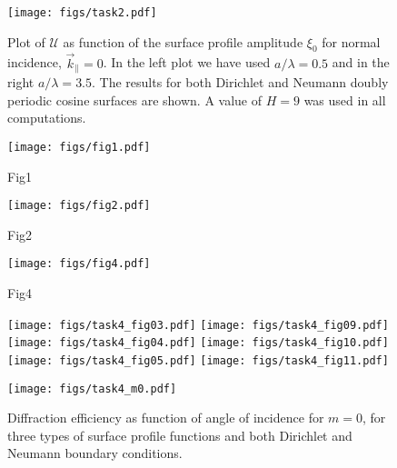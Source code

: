 
\begin{figure}[ht!]%
\centering%
\texttt{[image: figs/task2.pdf]}%
\caption{Plot of $\mathcal{U}$ as function of the surface profile amplitude $\xi_0$ for normal incidence, $\vec k_\| = 0$. In the left plot we have used $a/\lambda=0.5$ and in the right $a/\lambda=3.5$. The results for both Dirichlet and Neumann doubly periodic cosine surfaces are shown. A value of $H=9$ was used in all computations. \label{fig:task2conservation}}%
\end{figure}

\begin{figure}[ht!]%
\centering%
\texttt{[image: figs/fig1.pdf]}%
\caption{Fig1 \label{fig:fig1}}%
\end{figure}

\begin{figure}[ht!]%
\centering%
\texttt{[image: figs/fig2.pdf]}%
\caption{Fig2 \label{fig:fig2}}%
\end{figure}


\begin{figure}[p!]%
\centering%
\texttt{[image: figs/fig4.pdf]}%
\caption{Fig4 \label{fig:fig4}}%
\end{figure}

\begin{figure}[htp!]%
\centering%
\texttt{[image: figs/task4\_fig03.pdf]}%
\texttt{[image: figs/task4\_fig09.pdf]}%
\\%
\texttt{[image: figs/task4\_fig04.pdf]}%
\texttt{[image: figs/task4\_fig10.pdf]}%
\\%
\texttt{[image: figs/task4\_fig05.pdf]}%
\texttt{[image: figs/task4\_fig11.pdf]}%
\end{figure}

\begin{figure}[p!]%
\centering%
\texttt{[image: figs/task4\_m0.pdf]}%
\caption{Diffraction efficiency as function of angle of incidence for $m=0$, for three types of surface profile functions and both Dirichlet and Neumann boundary conditions. \label{fig:m0}}%
\end{figure}
